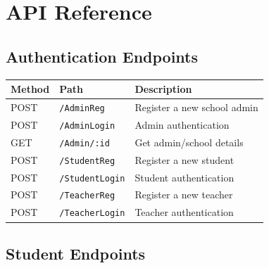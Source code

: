 \documentclass[12pt,a4paper]{report}
\begin{document}
\chapter{API Reference}

\section{Authentication Endpoints}

\begin{longtable}{@{}p{1.5cm}p{5cm}p{7.5cm}@{}}
  \toprule
  \textbf{Method} & \textbf{Path} & \textbf{Description} \\
  \midrule
  \endhead
  POST & \texttt{/AdminReg} & Register a new school admin \\[3pt]
  POST & \texttt{/AdminLogin} & Admin authentication \\[3pt]
  GET  & \texttt{/Admin/:id} & Get admin/school details \\[3pt]
  POST & \texttt{/StudentReg} & Register a new student \\[3pt]
  POST & \texttt{/StudentLogin} & Student authentication \\[3pt]
  POST & \texttt{/TeacherReg} & Register a new teacher \\[3pt]
  POST & \texttt{/TeacherLogin} & Teacher authentication \\
  \bottomrule
\end{longtable}

\section{Student Endpoints}
\end{document}
